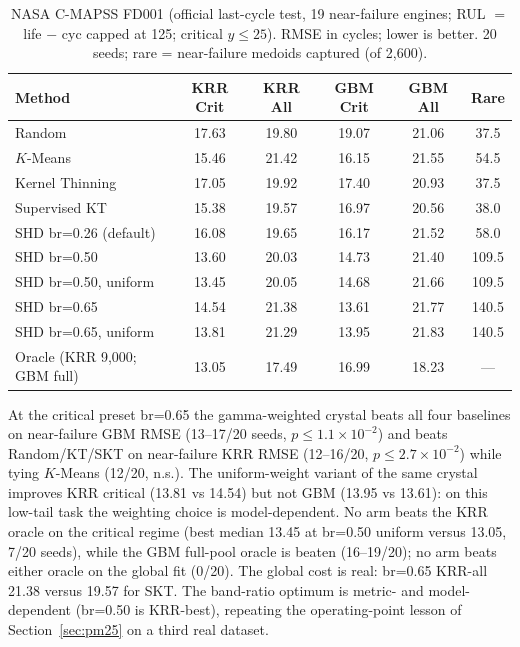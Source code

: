 \documentclass[11pt,a4paper]{article}
\begin{document}
\begin{table}[t]
\centering
\small
\caption{NASA C-MAPSS FD001 (official last-cycle test, 19 near-failure engines; RUL $=$ life $-$ cyc capped at 125; critical $y \le 25$). RMSE in cycles; lower is better. 20 seeds; rare = near-failure medoids captured (of 2,600).}
\label{tab:cmapss}
\begin{tabular}{lccccc}
\toprule
\textbf{Method} & \textbf{KRR Crit} & \textbf{KRR All} & \textbf{GBM Crit} & \textbf{GBM All} & \textbf{Rare} \\
\midrule
Random & 17.63 & 19.80 & 19.07 & 21.06 & 37.5 \\
$K$-Means & 15.46 & 21.42 & 16.15 & 21.55 & 54.5 \\
Kernel Thinning & 17.05 & 19.92 & 17.40 & 20.93 & 37.5 \\
Supervised KT & 15.38 & 19.57 & 16.97 & 20.56 & 38.0 \\
SHD br=0.26 (default) & 16.08 & 19.65 & 16.17 & 21.52 & 58.0 \\
SHD br=0.50 & 13.60 & 20.03 & 14.73 & 21.40 & 109.5 \\
SHD br=0.50, uniform & 13.45 & 20.05 & 14.68 & 21.66 & 109.5 \\
SHD br=0.65 & 14.54 & 21.38 & 13.61 & 21.77 & 140.5 \\
SHD br=0.65, uniform & 13.81 & 21.29 & 13.95 & 21.83 & 140.5 \\
\midrule
Oracle (KRR 9,000; GBM full) & 13.05 & 17.49 & 16.99 & 18.23 & --- \\
\bottomrule
\end{tabular}
\end{table}

At the critical preset br=0.65 the gamma-weighted crystal beats all four baselines on near-failure GBM RMSE (13--17/20 seeds, $p \le 1.1\times10^{-2}$) and beats Random/KT/SKT on near-failure KRR RMSE (12--16/20, $p \le 2.7\times10^{-2}$) while tying $K$-Means (12/20, n.s.). The uniform-weight variant of the same crystal improves KRR critical (13.81 vs 14.54) but not GBM (13.95 vs 13.61): on this low-tail task the weighting choice is model-dependent. No arm beats the KRR oracle on the critical regime (best median 13.45 at br=0.50 uniform versus 13.05, 7/20 seeds), while the GBM full-pool oracle is beaten (16--19/20); no arm beats either oracle on the global fit (0/20). The global cost is real: br=0.65 KRR-all 21.38 versus 19.57 for SKT. The band-ratio optimum is metric- and model-dependent (br=0.50 is KRR-best), repeating the operating-point lesson of Section~\ref{sec:pm25} on a third real dataset.
\end{document}
